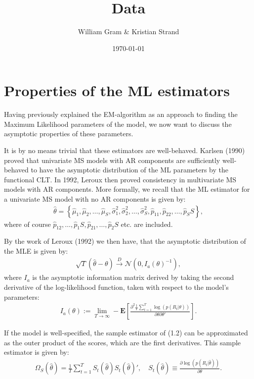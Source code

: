 \documentclass[11pt,a4paper,oneside]{article}
\title{Data}
\author{William Gram \& Kristian Strand}
\date{\today}
\newcommand{\lp}{\left(}
\newcommand{\rp}{\right)}
\newcommand{\rb}{\right]}
\newcommand{\lb}{\left[}
\newcommand{\lc}{\left\{}
\newcommand{\rc}{\right\}}
\newcommand{\ee}{\mathbf{E}}
\newcommand{\nnn}{\mathcal{N}}
\newcommand{\sumt}{\sum_{t=1}^T}
\begin{document}
\rfoot{\thepage}
\setcounter{page}{1}

\section{Properties of the ML estimators}

Having previously explained the EM-algorithm as an approach to finding the Maximum Likelihood parameters of the model, we now want to discuss the asymptotic properties of these parameters.

It is by no means trivial that these estimators are well-behaved. Karlsen (1990) proved that univariate MS models with AR components are sufficiently well-behaved to have the asymptotic distribution of the ML parameters by the functional CLT. In 1992, Leroux then proved consistency in multivariate MS models with AR components. More formally, we recall that the ML estimator for a univariate MS model with no AR components is given by:
\begin{align*}
    \hat \theta = \lc \hat \mu_1, \hat \mu_2, \dots, \hat \mu_S, \hat \sigma_1^2, \hat \sigma_2^2, \dots, \hat \sigma_S^2, \hat p_11, \hat p_22, \dots, \hat p_SS\rc,
\end{align*}
where of course $\hat p_12, \dots, \hat p_1S, \hat p_21, \dots, \hat p_2S$ etc. are included.

By the work of Leroux (1992) we then have, that the asymptotic distribution of the MLE is given by:
\begin{align}
    \sqrt{T}\lp \hat \theta - \theta\rp \overset{D}{\rightarrow} \nnn\lp 0, I_a\lp \theta\rp^{-1}\rp,
\end{align}
where $I_a$ is the asymptotic information matrix derived by taking the second derivative of the log-likelihood function, taken with respect to the model's parameters:
\begin{align}
    I_a\lp \theta\rp := \lim_{T\rightarrow \infty} - \ee\lb \frac{\partial^2 \frac{1}{T} \sumt\log \lp p\lp R_t\vert \theta\rp\rp}{\partial \theta\partial \theta'}\rb.
\end{align}

If the model is well-specified, the sample estimator of (1.2) can be approximated as the outer product of the scores, which are the first derivatives. This sample estimator is given by:
\begin{align}
    \Omega_S\lp \hat \theta\rp = \frac{1}{T}\sumt S_t\lp \hat \theta\rp S_t\lp \hat \theta\rp', \quad S_t\lp \hat \theta\rp \equiv \frac{\partial \log\lp p\lp R_t\vert \hat \theta \rp\rp}{\partial \theta}.
\end{align}
\end{document}
